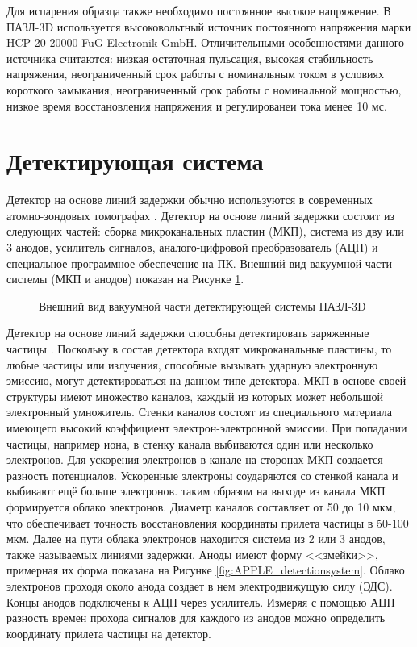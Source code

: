 Для испарения образца также необходимо постоянное высокое напряжение. В ПАЗЛ-3D используется высоковольтный источник постоянного напряжения марки HCP 20-20000 FuG Electronik GmbH. Отличительными особенностями данного источника считаются: низкая остаточная пульсация, высокая стабильность напряжения, неограниченный срок работы с номинальным током в условиях короткого замыкания, неограниченный срок работы с номинальной мощностью, низкое время восстановления напряжения и регулированеи тока менее 10 мс.  



\FloatBarrier

\section{Детектирующая система}\label{sec:ch2/sec4}

Детектор на основе линий задержки обычно используются в современных атомно-зондовых томографах \cite{Stender07,DaCosta05}. Детектор на основе линий задержки состоит из следующих частей: сборка микроканальных пластин (МКП), система из дву или 3 анодов, усилитель сигналов, аналого-цифровой преобразователь (АЦП) и специальное программное обеспечение на ПК. Внешний вид вакуумной части системы (МКП и анодов) показан на Рисунке \cref{fig:DetectionsystemFoto}.

\begin{figure}[htb]
	\caption{Внешний вид вакуумной части детектирующей системы ПАЗЛ-3D}
	\label{fig:DetectionsystemFoto}	
\end{figure}

Детектор на основе линий задержки способны детектировать заряженные частицы \cite{Spillman00} . Поскольку в состав детектора входят микроканальные пластины, то любые частицы или излучения, способные вызывать ударную электронную эмиссию, могут детектироваться на данном типе детектора. МКП в основе своей структуры имеют множество каналов, каждый из которых может небольшой электронный умножитель. Стенки каналов состоят из специального материала имеющего высокий коэффициент электрон-электронной эмиссии. При попадании частицы, например иона, в стенку канала выбиваются один или несколько электронов. Для ускорения электронов в канале на сторонах МКП создается разность потенциалов. Ускоренные электроны соударяются со стенкой канала и выбивают ещё больше электронов. таким образом на выходе из канала МКП формируется облако электронов. Диаметр каналов составляет от 50 до 10 мкм, что обеспечивает точность восстановления координаты прилета частицы в 50-100 мкм. Далее на пути облака электронов находится система из 2 или 3 анодов, также называемых линиями задержки. Аноды имеют форму <<змейки>>, примерная их форма показана на Рисунке \cref{fig:APPLE_detectionsystem}. Облако электронов проходя около анода создает в нем электродвижущую силу (ЭДС). Концы анодов подключены к АЦП через усилитель. Измеряя с помощью АЦП разность времен прохода сигналов для каждого из анодов можно определить координату прилета частицы на детектор.

